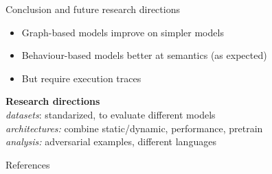 \documentclass[169]{beamer}
\begin{document}
\begin{frame}[t]{Conclusion and future research directions}
  \begin{itemize}
      \item Graph-based models improve on simpler models
      \item Behaviour-based models better at semantics (as expected)
      \item But require execution traces
  \end{itemize}
  \vspace{1ex}
  \textbf{Research directions} \\
  \emph{datasets}: standarized, to evaluate different models \\
  \emph{architectures:} combine static/dynamic, performance, pretrain \\
  \emph{analysis:} adversarial examples, different languages \\

\end{frame}

\appendix

\begin{frame}[allowframebreaks]{References}

  
  

\end{frame}
\end{document}
